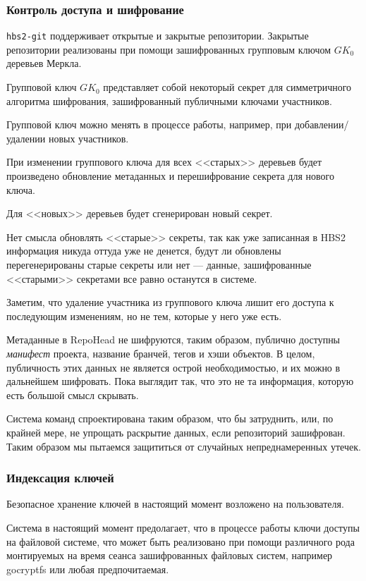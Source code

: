 \documentclass[11pt,a4paper]{article}
\begin{document}
\subsubsection*{Контроль доступа и шифрование}

\texttt{hbs2-git} поддерживает открытые и закрытые репозитории. Закрытые репозитории
реализованы при помощи зашифрованных групповым ключом $GK_0$ деревьев Меркла.

Групповой ключ $GK_0$ представляет собой некоторый секрет для симметричного алгоритма шифрования,
зашифрованный публичными ключами участников.

Групповой ключ можно менять в процессе работы, например, при добавлении/удалении новых участников.

При изменении группового ключа для всех <<старых>> деревьев будет произведено обновление метаданных
и перешифрование секрета для нового ключа.

Для <<новых>> деревьев будет сгенерирован новый секрет.

Нет смысла обновлять <<старые>> секреты, так как уже записанная в HBS2 информация никуда оттуда уже
не денется, будут ли обновлены перегенерированы старые секреты или нет --- данные, зашифрованные
<<старыми>> секретами все равно останутся в системе.

Заметим, что удаление участника из группового ключа лишит его доступа к последующим изменениям, но
не тем, которые у него уже есть.

Метаданные в RepoHead не шифруются, таким образом, публично доступны \textit{манифест} проекта,
название бранчей, тегов и хэши объектов. В целом, публичность этих данных не является острой
необходимостью, и их можно в дальнейшем шифровать. Пока выглядит так, что это не та информация,
которую есть большой смысл скрывать.

Система команд спроектирована таким образом, что бы затруднить, или, по крайней мере, не упрощать
раскрытие данных, если репозиторий зашифрован. Таким образом мы пытаемся защититься от случайных
непреднамеренных утечек.


\subsubsection*{Индексация ключей}

Безопасное хранение ключей в настоящий момент возложено на пользователя.

Система в настоящий момент предолагает, что в процессе работы ключи
доступы на файловой системе, что может быть реализовано при помощи
различного рода монтируемых на время сеанса зашифрованных файловых
систем, например gocryptfs или любая предпочитаемая.
\end{document}
